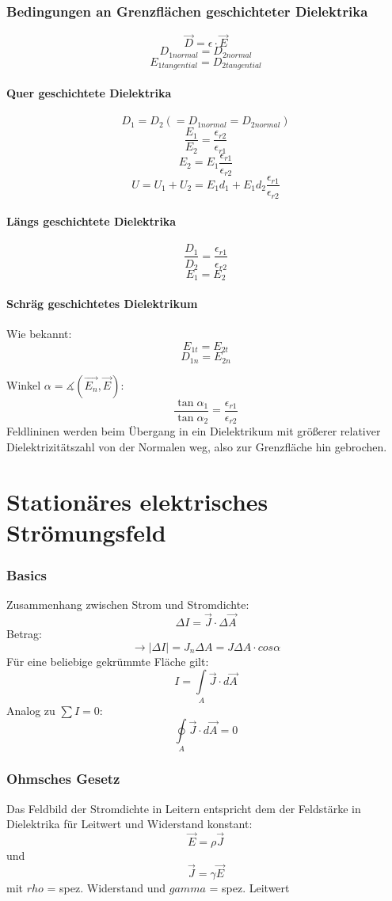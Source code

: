 \documentclass[12pt,a4paper]{article}
\begin{document}
\section{Bedingungen an Grenzflächen geschichteter Dielektrika}
\[\vec{D} = \epsilon \cdot \vec{E}\]
\[D_{1normal} = D_{2normal}\]
\[E_{1tangential} = D_{2tangential}\]

\subsection{Quer geschichtete Dielektrika}
\[D_1 = D_2 (=D_{1normal} = D_{2normal})\]
\[\frac{E_1}{E_2} = \frac{\epsilon_{r2}}{\epsilon_{r1}}\]
\[E_2 = E_1 \frac{\epsilon_{r1}}{\epsilon_{r2}}\]
\[U = U_1 +U_2 = E_1 d_1+E_1 d_2\frac{\epsilon_{r1}}{\epsilon_{r2}}\]

\subsection{Längs geschichtete Dielektrika}
\[\frac{D_1}{D_2} = \frac{\epsilon_{r1}}{\epsilon_{r2}}\]
\[E_1 = E_2\]

\subsection{Schräg geschichtetes Dielektrikum}
Wie bekannt:
\[E_{1t} = E_{2t}\]
\[D_{1n} = E_{2n}\]

Winkel $\alpha = \measuredangle{(\vec{E_n}, \vec{E})}$:
\[\frac{\tan\alpha_1}{\tan\alpha_2} = \frac{\epsilon_{r1}}{\epsilon_{r2}}\]
Feldlininen werden beim Übergang in ein Dielektrikum mit größerer relativer Dielektrizitätszahl von der Normalen weg, also zur Grenzfläche hin gebrochen.


\part{Stationäres elektrisches Strömungsfeld}
\section{Basics}
Zusammenhang zwischen Strom und Stromdichte:
\[\Delta I = \vec{J} \cdot \Delta \vec{A}\]
Betrag:
\[\rightarrow \left| \Delta I\right| = J_n \Delta A = J\Delta A \cdot cos \alpha\]
Für eine beliebige gekrümmte Fläche gilt:
\[I = \int\limits_A{\vec{J} \cdot d\vec{A}}\]
Analog zu $\sum{I} = 0$:
\[\oint\limits_A{\vec{J} \cdot d\vec{A}} = 0\]

\section{Ohmsches Gesetz}
Das Feldbild der Stromdichte in Leitern entspricht dem der Feldstärke in Dielektrika für Leitwert und Widerstand konstant:\\
\[\vec{E} = \rho \vec{J}\] und \[\vec{J} = \gamma \vec{E}\] mit $rho$ = spez. Widerstand und $gamma$ = spez. Leitwert\\
\end{document}
